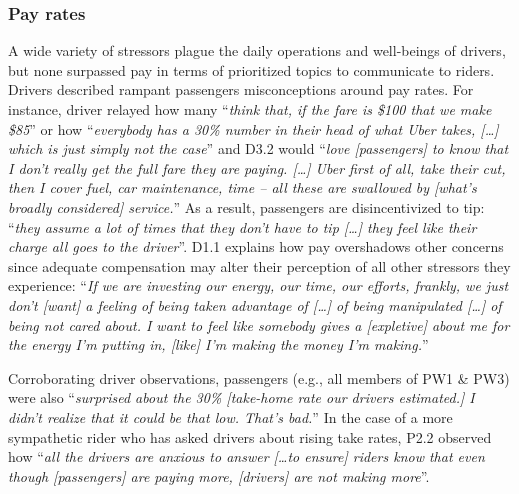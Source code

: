 \subsubsection{Pay rates} 
A wide variety of stressors plague the daily operations and well-beings of drivers, but none 
surpassed pay in terms of prioritized topics to communicate to riders.
Drivers described rampant passengers misconceptions around pay rates. For instance, driver  relayed how many ``\textit{think that, if the fare is \$100 that we make \$85}'' or how ``\textit{everybody has a 30\% number in their head of what Uber takes, [\dots] which is just simply not the case}'' and
D3.2 would ``\textit{love [passengers] to know that I don't really get the full fare they are paying. [\dots] Uber first of all, take their cut, then I cover fuel, car maintenance, time -- all these are swallowed by [what's broadly considered] service.}''
As a result, passengers are disincentivized to tip: ``\textit{they assume a lot of times that they don't have to tip [\dots] they feel like their charge all goes to the driver}''. 
D1.1 explains how pay overshadows other concerns since adequate compensation may alter their perception of all other stressors they experience: ``\textit{If we are investing our energy, our time, our efforts, frankly, we just don't [want] a feeling of being taken advantage of [\dots] of being manipulated [\dots] of being not cared about. I want to feel like somebody gives a [expletive] about me for the energy I'm putting in, [like] I'm making the money I'm making.}''


Corroborating driver observations, passengers (e.g., all members of PW1 \& PW3) were also ``\textit{surprised about the 30\% [take-home rate our drivers estimated.] I didn't realize that it could be that low. That's bad.}'' In the case of a more sympathetic rider who has asked drivers about rising take rates, P2.2 observed how ``\textit{all the drivers are anxious to answer [\dots to ensure] riders know that even though [passengers] are paying more, [drivers] are not making more}''. 


